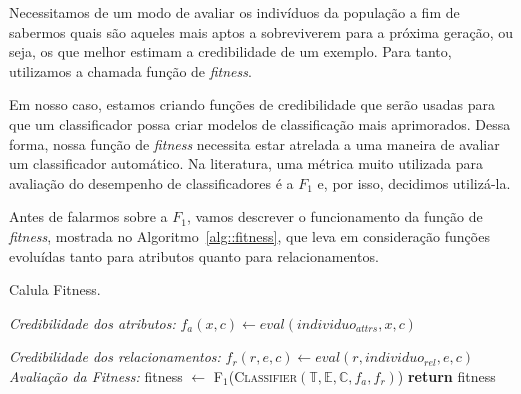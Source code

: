 Necessitamos de um modo de avaliar os indivíduos da população a fim de sabermos quais são aqueles mais aptos a sobreviverem para a próxima geração, ou seja, os que melhor estimam a credibilidade de um exemplo.
Para tanto, utilizamos a chamada função de \textit{fitness}. 

Em nosso caso, estamos criando funções de credibilidade que serão usadas para que um classificador possa criar modelos de classificação mais aprimorados.
Dessa forma, nossa função de \textit{fitness} necessita estar atrelada a uma maneira de avaliar um classificador automático.
Na literatura, uma métrica muito utilizada para avaliação do desempenho de classificadores é a $F_1$ e, por isso, decidimos utilizá-la.

Antes de falarmos sobre a $F_1$, vamos descrever o funcionamento da função de \textit{fitness}, mostrada no Algoritmo~\ref{alg::fitness}, que leva em consideração funções evoluídas tanto para atributos quanto para relacionamentos.

\algrenewcommand{}
\algrenewcommand{}
\algrenewcommand{}
\algrenewcommand{}

\begin{algorithm}
\centering
\caption{Calula Fitness.}
\label{alg::fitness}
\begin{algorithmic}[!h]
{
{}
  \State  
  \State \textit{Credibilidade dos atributos:}
      \State $f_a(x,c) \gets eval(individuo_{attrs}, x, c)$
    \EndFor
  \EndFor
  \EndIf
  \State
  
  \State \textit{Credibilidade dos relacionamentos:}
            \State $f_r(r,e,c) \gets eval(r,individuo_{rel}, e, c)$
        \EndFor
    \EndFor
  \EndFor
  \EndIf
  \State
  \State \textit{Avaliação da Fitness:}
  \State fitness $\gets$ \textsc{F$_1$}(\textsc{Classifier}$(\mathbb{T}, \mathbb{E}, \mathbb{C}, f_a, f_r)$)
  \State \textbf{return} fitness
\EndFunction
}
\end{algorithmic}
\end{algorithm}

